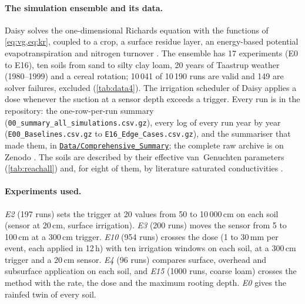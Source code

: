 \documentclass[preprint,12pt,authoryear]{elsarticle}
\newcommand{\csurl}{https://github.com/halilunaziru73-creator/Coupled-Water-Fluxes-Pore-Scale-Dynamics-Precision-Irrigation-Mulching-Feedback-Loops/tree/main/Data/Comprehensive_Summary}
\newcommand{\cslink}{\href{\csurl}{\nolinkurl{Data/Comprehensive_Summary}}}
\begin{document}
\paragraph{The simulation ensemble and its data.}
Daisy solves the one-dimensional Richards equation with the functions of \cref{eq:vg,eq:kr}, coupled to a crop, a surface residue layer, an energy-based potential evapotranspiration and nitrogen turnover \citep{Hansen1991,Hansen2012,Holbak2026}. The ensemble has 17 experiments (E0 to E16), ten soils from sand to silty clay loam, 20 years of Taastrup weather (1980--1999) and a cereal rotation; 10\,041 of 10\,190 runs are valid and 149 are solver failures, excluded (\cref{tab:data4}). The irrigation scheduler of Daisy applies a dose whenever the suction at a sensor depth exceeds a trigger. Every run is in the repository: the one-row-per-run summary (\texttt{00\_summary\_all\_simulations.csv.gz}), every log of every run year by year (\texttt{E00\_Baselines.csv.gz} to \texttt{E16\_Edge\_Cases.csv.gz}), and the summariser that made them, in \cslink; the complete raw archive is on Zenodo \citep{HaliluData}. The soils are described by their effective van~Genuchten parameters (\cref{tab:reachall}) and, for eight of them, by literature saturated conductivities \citep{Carsel1988}.





\paragraph{Experiments used.}
\emph{E2} (197 runs) sets the trigger at 20 values from 50 to 10\,000\,cm on each soil (sensor at 20\,cm, surface irrigation). \emph{E3} (200 runs) moves the sensor from 5 to 100\,cm at a 300\,cm trigger. \emph{E10} (954 runs) crosses the dose (1 to 30\,mm per event, each applied in 12\,h) with ten irrigation windows on each soil, at a 300\,cm trigger and a 20\,cm sensor. \emph{E4} (96 runs) compares surface, overhead and subsurface application on each soil, and \emph{E15} (1000 runs, coarse loam) crosses the method with the rate, the dose and the maximum rooting depth. \emph{E0} gives the rainfed twin of every soil.
\end{document}
